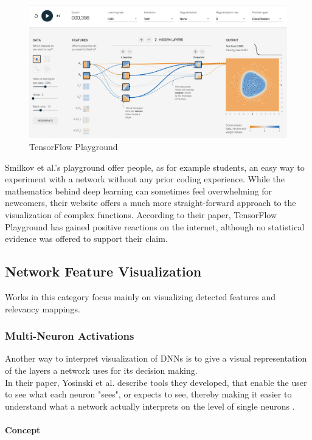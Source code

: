 \documentclass{acmsiggraph}               %
\newcommand{\paragraphbr}[1]{\paragraph{#1}\mbox{}\\}
\begin{document}
\begin{figure}
\includegraphics[width=\textwidth]{tensorflow_playground_smilkov_et_al}
\caption{TensorFlow Playground \protect\cite{Smilkov2017}}
\label{fig:tensorflow_playground}
\centering
\end{figure}

Smilkov et al.'s playground offer people, as for example students, an easy way to experiment with a network without any prior coding experience. While the mathematics behind deep learning can sometimes feel overwhelming for newcomers, their website offers a much more straight-forward approach to the visualization of complex functions. According to their paper, TensorFlow Playground has gained positive reactions on the internet, although no statistical evidence was offered to support their claim.

\subsection{Network Feature Visualization}
Works in this category focus mainly on visualizing detected features and relevancy mappings.

\subsubsection{Multi-Neuron Activations}
Another way to interpret visualization of DNNs is to give a visual representation of the layers a network uses for its decision making.\\ 
In their paper, Yosinski et al. describe tools they developed, that enable the user to see what each neuron "sees", or expects to see, thereby making it easier to understand what a network actually interprets on the level of single neurons \cite{Yosinski2015}.

\pagebreak
\paragraphbr{Concept}
\end{document}
